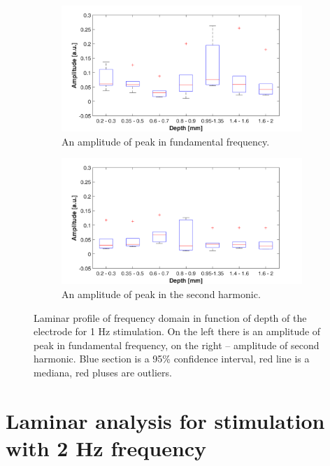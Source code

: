 \documentclass{pracalicmgr}
\begin{document}
\begin{figure}[H]
	\begin{subfigure}{.5\textwidth}
		\centering
		\includegraphics[width=1.\linewidth]{profile_1Hz_wid.png}
		\caption{An amplitude of peak in fundamental frequency.}
		\label{rys:profil_1Hz_wid1}
	\end{subfigure}%
	\begin{subfigure}{.5\textwidth}
		\centering
		\includegraphics[width=1.\linewidth]{profile_1Hz_wid2.png}
		\caption{An amplitude of peak in the second harmonic.}
		\label{rys:profil_1Hz_wid2}
	\end{subfigure}
	
	\caption{Laminar profile of frequency domain in function of depth of the electrode for 1 Hz stimulation. On the left there is an amplitude of peak in fundamental frequency, on the right -- amplitude of second harmonic. Blue section is a 95\% confidence interval, red line is a mediana, red pluses are outliers. }
	\label{rys:profil_1Hz_wid}
\end{figure}


 
 \section{Laminar analysis for stimulation with 2 Hz frequency}
  
\end{document}
